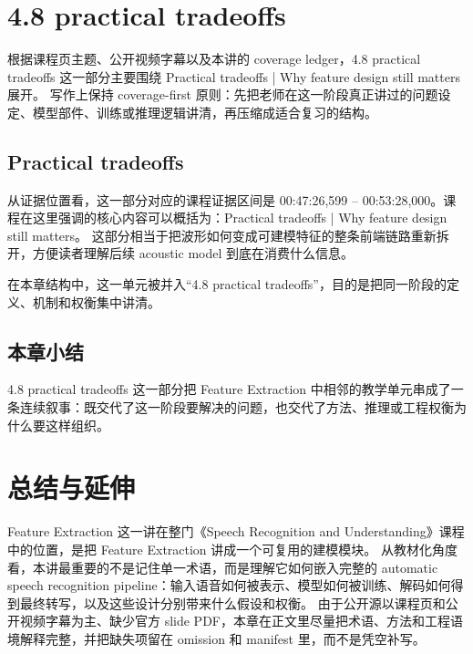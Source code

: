 \documentclass[a4paper]{article}
\begin{document}
\section{4.8 practical tradeoffs}
根据课程页主题、公开视频字幕以及本讲的 coverage ledger，4.8 practical tradeoffs 这一部分主要围绕 Practical tradeoffs | Why feature design still matters 展开。
写作上保持 coverage-first 原则：先把老师在这一阶段真正讲过的问题设定、模型部件、训练或推理逻辑讲清，再压缩成适合复习的结构。

\subsection{Practical tradeoffs}
从证据位置看，这一部分对应的课程证据区间是 00:47:26,599 -- 00:53:28,000。课程在这里强调的核心内容可以概括为：Practical tradeoffs | Why feature design still matters。
这部分相当于把波形如何变成可建模特征的整条前端链路重新拆开，方便读者理解后续 acoustic model 到底在消费什么信息。

在本章结构中，这一单元被并入“4.8 practical tradeoffs”，目的是把同一阶段的定义、机制和权衡集中讲清。

\subsection{本章小结}
4.8 practical tradeoffs 这一部分把 Feature Extraction 中相邻的教学单元串成了一条连续叙事：既交代了这一阶段要解决的问题，也交代了方法、推理或工程权衡为什么要这样组织。

\section{总结与延伸}
Feature Extraction 这一讲在整门《Speech Recognition and Understanding》课程中的位置，是把 Feature Extraction 讲成一个可复用的建模模块。
从教材化角度看，本讲最重要的不是记住单一术语，而是理解它如何嵌入完整的 automatic speech recognition pipeline：输入语音如何被表示、模型如何被训练、解码如何得到最终转写，以及这些设计分别带来什么假设和权衡。
由于公开源以课程页和公开视频字幕为主、缺少官方 slide PDF，本章在正文里尽量把术语、方法和工程语境解释完整，并把缺失项留在 omission 和 manifest 里，而不是凭空补写。
\end{document}
